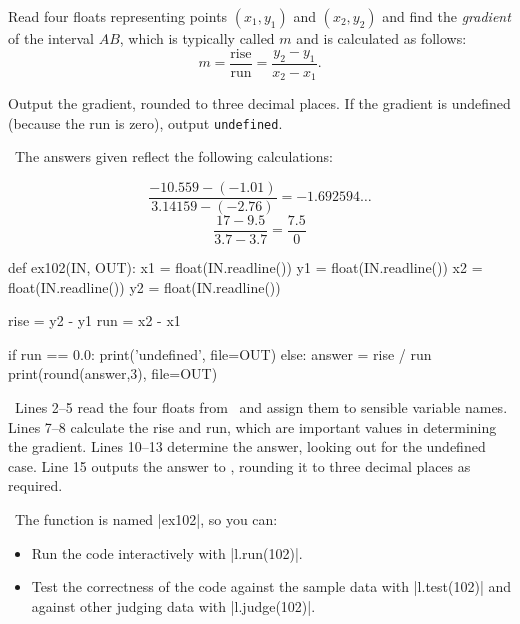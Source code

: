 \clearpage


\Question Read four floats representing points $(x_1,y_1)$ and
$(x_2,y_2)$ and find the \emph{gradient} of the interval $AB$, which is typically called
$m$ and is calculated as follows:
\[ m = \frac{\mathrm{rise}}{\mathrm{run}} = \frac{y_2 - y_1}{x_2 - x_1}.\]

Output the gradient, rounded to three decimal places.  If the gradient is undefined
(because the run is zero), output \texttt{undefined}.

\Sample

               {}
               {}

\Explanation\ The answers given reflect the following calculations:

\vspace{-5mm}
\minipagesthree{\[\frac{3.5-1}{10-5} = 0.5\]}
               {\[\frac{-10.559 - (-1.01)}{3.14159 - (-2.76)} = -1.692594\ldots\]}
               {\[\frac{17 - 9.5}{3.7 - 3.7} = \frac{7.5}{0}\]}


\Solution

\begin{pythoncode} 
  def ex102(IN, OUT):
    x1 = float(IN.readline())
    y1 = float(IN.readline())
    x2 = float(IN.readline())
    y2 = float(IN.readline())

    rise = y2 - y1
    run  = x2 - x1

    if run == 0.0:
      print('undefined', file=OUT)
    else:
      answer = rise / run
      print(round(answer,3), file=OUT)
\end{pythoncode}

\Explanation\ Lines 2--5 read the four floats from \IN\ and assign them to sensible
variable names. Lines 7--8 calculate the rise and run, which are important values in
determining the gradient. Lines 10--13 determine the answer, looking out for the undefined
case. Line 15 outputs the answer to \OUT, rounding it to three decimal places as required.

\Running\ The function is named \pycode|ex102|, so you can:
\begin{itemize}
  \item Run the code interactively with \pycode|l.run(102)|.
  \item Test the correctness of the code against the sample data with \pycode|l.test(102)|
    and against other judging data with \pycode|l.judge(102)|.
\end{itemize}

